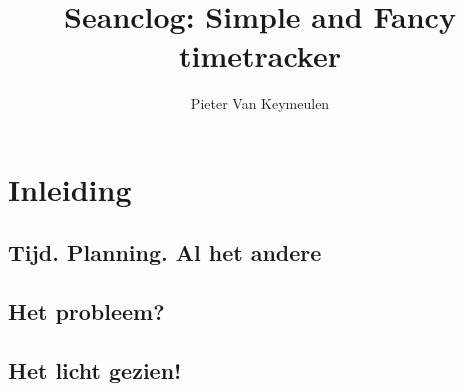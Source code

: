 \documentclass[a4paper,11pt]{article}
\begin{document}
\title{Seanclog: Simple and Fancy timetracker}
\author{Pieter Van Keymeulen}
\maketitle

\section{Inleiding}

\subsection{Tijd. Planning. Al het andere}

\subsection{Het probleem?}

\subsection{Het licht gezien!}
\end{document}
